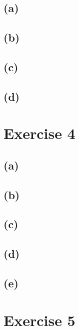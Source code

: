 \documentclass[12pt]{article}
\begin{document}
\subsection*{(a)}
\subsection*{(b)}
\subsection*{(c)}
\subsection*{(d)}

\section*{Exercise 4}
\subsection*{(a)}
\subsection*{(b)}
\subsection*{(c)}
\subsection*{(d)}
\subsection*{(e)}

\section*{Exercise 5}
\end{document}

